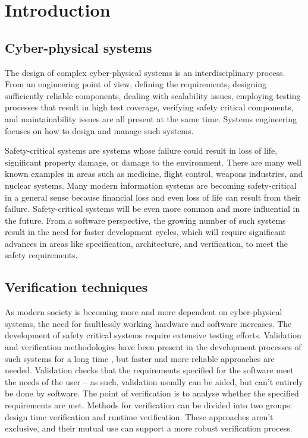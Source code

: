 \chapter{Introduction}
\label{chap:intro}

\section{Cyber-physical systems}

The design of complex cyber-physical systems is an interdisciplinary process. From an engineering point of view, defining the requirements, designing sufficiently reliable components, dealing with scalability issues, employing testing processes that result in high test coverage, verifying safety critical components, and maintainability issues are all present at the same time. Systems engineering focuses on how to design and manage such systems. \cite{randomwikipedialink1}

Safety-critical systems are systems whose failure could result in loss of life, significant property damage, or damage to the environment. There are many well known examples in areas such as medicine, flight control, weapons industries, and nuclear systems. Many modern information systems are becoming safety-critical in a general sense because financial loss and even loss of life can result from their failure. Safety-critical systems will be even more common and more influential in the future. From a software perspective, the growing number of such systems result in the need for faster development cycles, which will require significant advances in areas like specification, architecture, and verification, to meet the safety requirements. \cite{safetycritical}

\section{Verification techniques}

As modern society is becoming more and more dependent on cyber-physical systems, the need for faultlessly working hardware and software increases. The development of safety critical systems require extensive testing efforts. Validation and verification methodologies have been present in the development processes of such systems for a long time \citep{ieee1012}, but faster and more reliable approaches are needed. Validation checks that the requirements specified for the software meet the needs of the user -- as such, validation usually can be aided, but can’t entirely be done by software. The point of verification is to analyse whether the specified requirements are met. Methods for verification can be divided into two groups: design time verification and runtime verification. These approaches aren't exclusive, and their mutual use can support a more robust verification process.

